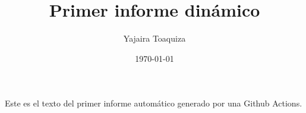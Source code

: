 \usepackage{amsmath, float}
\title{Primer informe dinámico}
\author{Yajaira Toaquiza}
\date{\today}



\maketitle
Este es el texto del primer informe automático generado por una Github Actions.
